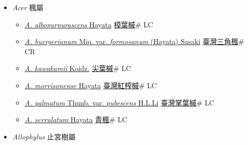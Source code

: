 
  \begin{itemize}
 \item[] \textit{Acer} 楓屬
                    
  \begin{itemize}
        \item[] \href{http://www.theplantlist.org/tpl1.1/search?q=Acer+albopurpurascens}{\textit{A. albopurpurascens} Hayata}   \href{\detokenize{http://taibnet.sinica.edu.tw/chi/taibnet_species_list.php?T2=樟葉槭&T2_new_value=true&fr=y}}{樟葉槭}\# LC
        \item[] \href{http://www.theplantlist.org/tpl1.1/search?q=Acer+buergerianum+var.+formosanum}{\textit{A. buergerianum} Miq. var. \textit{formosanum} (Hayata) Sasaki}   \href{\detokenize{http://taibnet.sinica.edu.tw/chi/taibnet_species_list.php?T2=臺灣三角楓&T2_new_value=true&fr=y}}{臺灣三角楓}\# CR
        \item[] \href{http://www.theplantlist.org/tpl1.1/search?q=Acer+kawakamii}{\textit{A. kawakamii} Koidz.}   \href{\detokenize{http://taibnet.sinica.edu.tw/chi/taibnet_species_list.php?T2=尖葉槭&T2_new_value=true&fr=y}}{尖葉槭}\# LC
        \item[] \href{http://www.theplantlist.org/tpl1.1/search?q=Acer+morrisonense}{\textit{A. morrisonense} Hayata}   \href{\detokenize{http://taibnet.sinica.edu.tw/chi/taibnet_species_list.php?T2=臺灣紅榨槭&T2_new_value=true&fr=y}}{臺灣紅榨槭}\# LC
        \item[] \href{http://www.theplantlist.org/tpl1.1/search?q=Acer+palmatum+var.+pubescens}{\textit{A. palmatum} Thunb. var. \textit{pubescens} H.L.Li}   \href{\detokenize{http://taibnet.sinica.edu.tw/chi/taibnet_species_list.php?T2=臺灣掌葉槭&T2_new_value=true&fr=y}}{臺灣掌葉槭}\# LC
        \item[] \href{http://www.theplantlist.org/tpl1.1/search?q=Acer+serrulatum}{\textit{A. serrulatum} Hayata}   \href{\detokenize{http://taibnet.sinica.edu.tw/chi/taibnet_species_list.php?T2=青楓&T2_new_value=true&fr=y}}{青楓}\# LC
  \end{itemize}
 \item[] \textit{Allophylus} 止宮樹屬
                    

\end{itemize}
